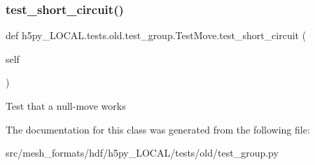 \subsubsection{\texorpdfstring{test\+\_\+short\+\_\+circuit()}{test\_short\_circuit()}}
{\footnotesize\ttfamily def h5py\+\_\+\+L\+O\+C\+A\+L.\+tests.\+old.\+test\+\_\+group.\+Test\+Move.\+test\+\_\+short\+\_\+circuit (\begin{DoxyParamCaption}\item[{}]{self }\end{DoxyParamCaption})}

\begin{DoxyVerb}Test that a null-move works \end{DoxyVerb}
 

The documentation for this class was generated from the following file\+:\begin{DoxyCompactItemize}
\item 
src/mesh\+\_\+formats/hdf/h5py\+\_\+\+L\+O\+C\+A\+L/tests/old/test\+\_\+group.\+py\end{DoxyCompactItemize}

